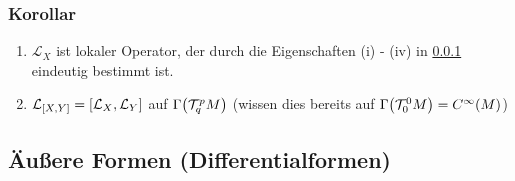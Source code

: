 \subsubsection{Korollar}
\label{ssub:187}
\begin{enumerate}
\item $\mathcal{L}_X$ ist lokaler Operator, der durch die Eigenschaften (i) - (iv) in \ref{ssub:187} eindeutig bestimmt ist.
\item $\mathcal{L}_{[X,Y]} = [\mathcal{L}_X,\mathcal{L}_Y]$ auf $\Gamma\enbrace*{\mathcal{T}_q^p M}$ (wissen dies bereits auf $\Gamma\enbrace*{\mathcal{T}_0^0 M} = C^\infty (M)$)
\end{enumerate}

\subsection{Äußere Formen (Differentialformen)}
\label{sub:111}

